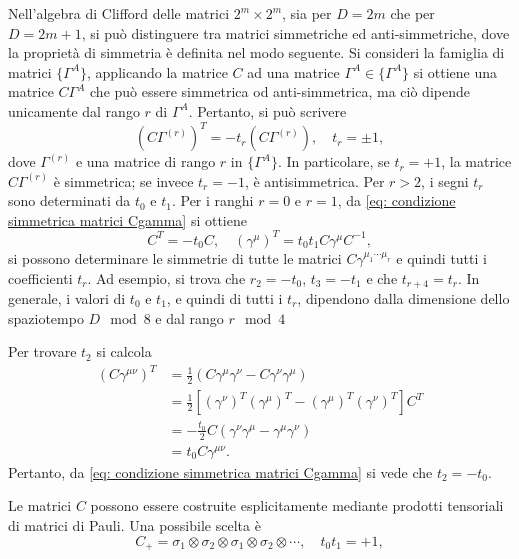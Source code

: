 Nell'algebra di Clifford delle matrici $2^m \times 2^m$, sia per $D = 2m$ che per $D = 2m + 1$, si può distinguere tra matrici simmetriche ed anti-simmetriche, dove la proprietà di simmetria è definita nel modo seguente. Si consideri la famiglia di matrici $\{\Gamma^A\}$, applicando la matrice $C$ ad una matrice $\Gamma^A \in \{\Gamma^A\}$ si ottiene una matrice $C\Gamma^A$ che può essere simmetrica od anti-simmetrica, ma ciò dipende unicamente dal rango $r$ di $\Gamma^A$. Pertanto, si può scrivere 
\begin{equation}
\label{eq: condizione simmetrica matrici Cgamma}
    (C\Gamma^{(r)})^T = -t_r(C\Gamma^{(r)}),\quad t_r = \pm 1,
\end{equation}
dove $\Gamma^{(r)}$ e una matrice di rango $r$ in $\{\Gamma^A\}$. In particolare, se $t_r = +1$, la matrice $C\Gamma^{(r)}$ è simmetrica; se invece $t_r = -1$, è antisimmetrica. Per $r > 2$, i segni $t_r$ sono determinati da $t_0$ e $t_1$. Per i ranghi $r = 0$ e $r = 1$, da \eqref{eq: condizione simmetrica matrici Cgamma} si ottiene
\begin{equation}
    C^T = -t_0C,\quad (\gamma^\mu)^T = t_0t_1C\gamma^\mu C^{-1},
\end{equation}
si possono determinare le simmetrie di tutte le matrici $C\gamma^{\mu_1\cdots\mu_r}$ e quindi tutti i coefficienti $t_r$. Ad esempio, si trova che $r_2 = -t_0$, $t_3 = -t_1$ e che $t_{r + 4} = t_r$. In generale, i valori di $t_0$ e $t_1$, e quindi di tutti i $t_r$, dipendono dalla dimensione dello spaziotempo $D\mod{8}$ e dal rango $r\mod{4}$
\begin{ex}
    Per trovare $t_2$ si calcola
    \begin{equation}
    \begin{split}
        (C\gamma^{\mu\nu})^T &= \frac{1}{2}(C\gamma^\mu\gamma^\nu - C\gamma^\nu\gamma^\mu) \\
        &= \frac{1}{2}[(\gamma^\nu)^T(\gamma^\mu)^T - (\gamma^\mu)^T(\gamma^\nu)^T]C^T \\
        &= -\frac{t_0}{2}C(\gamma^\nu\gamma^\mu - \gamma^\mu\gamma^\nu) \\
        &= t_0C\gamma^{\mu\nu}.
    \end{split}
\end{equation}
Pertanto, da \eqref{eq: condizione simmetrica matrici Cgamma} si vede che $t_2 = -t_0$.
\end{ex}
Le matrici $C$ possono essere costruite esplicitamente mediante prodotti tensoriali di matrici di Pauli. Una possibile scelta è
\begin{equation}
\label{eq: definizione matrice C+}
    C_+=\sigma_1\otimes\sigma_2\otimes\sigma_1
    \otimes\sigma_2\otimes\cdots,
    \quad t_0t_1=+1,
\end{equation}
